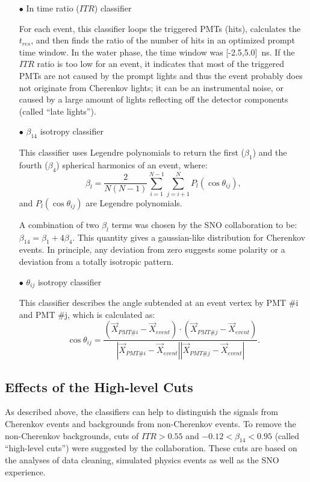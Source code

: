 \begin{itemize}
	\item[$\bullet$] In time ratio ($ITR$) classifier
	
	For each event, this classifier loops the triggered PMTs (hits), calculates the $t_{res}$, and then finds the ratio of the number of hits in an optimized prompt time window. In the water phase, the time window was [-2.5,5.0]~ns. If the $ITR$ ratio is too low for an event, it indicates that most of the triggered PMTs are not caused by the prompt lights and thus the event probably does not originate from Cherenkov lights; it can be an instrumental noise, or caused by a large amount of lights reflecting off the detector components (called ``late lights''). 
	
	\item[$\bullet$] $\beta_{14}$ isotropy classifier
	
	This classifier uses Legendre polynomials to return the	first ($\beta_1$) and the fourth ($\beta_4$) spherical harmonics of an event, where:
	\begin{equation}
	\beta_l = \frac{2}{N(N-1)}\sum_{i=1}^{N-1}\sum_{j=i+1}^N P_l(\cos\theta_{ij}),
	\end{equation}
	and $P_l(\cos\theta_{ij})$ are Legendre polynomials. 
	
	A combination of two $\beta_l$ terms was chosen by the SNO collaboration to be: $\beta_{14}=\beta_1+4\beta_4$. This quantity gives a gaussian-like distribution for Cherenkov events\cite{dunmore2004separation}.	In principle, any deviation from zero suggests some polarity or a deviation from a totally isotropic pattern.
	
	\item[$\bullet$] $\theta_{ij}$ isotropy classifier 
	
	This classifier describes the angle subtended at an event vertex by PMT \#i and PMT \#j, which is calculated as:
	\begin{equation}
	\cos\theta_{ij}=\frac{(\vec{X}_{PMT\#i}- \vec{X}_{event})\cdot (\vec{X}_{PMT\#j}- \vec{X}_{event})}{|\vec{X}_{PMT\#i}- \vec{X}_{event}||\vec{X}_{PMT\#j}- \vec{X}_{event}|}.
	\end{equation}
\end{itemize}

\subsection{Effects of the High-level Cuts}
As described above, the classifiers can help to distinguish the signals from Cherenkov events and backgrounds from non-Cherenkov events. To remove the non-Cherenkov backgrounds, cuts of $ITR>0.55$ and $-0.12<\beta_{14}<0.95$ (called ``high-level cuts'') were suggested by the collaboration\cite{waterunidoc}. These cuts are based on the analyses of data cleaning, simulated physics events as well as the SNO experience\cite{waterunidoc,marzec2019measurement,dunmore2004separation}.

